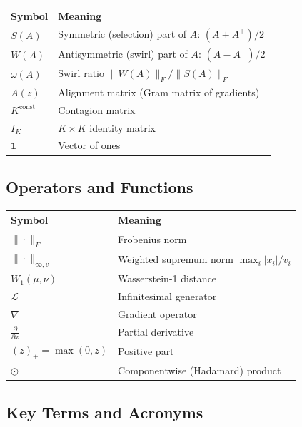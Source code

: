 \documentclass[12pt]{article}
\begin{document}
\begin{tabular}{ll}
\toprule
\textbf{Symbol} & \textbf{Meaning} \\
\midrule
$S(A)$ & Symmetric (selection) part of $A$: $(A + A^\top)/2$ \\
$W(A)$ & Antisymmetric (swirl) part of $A$: $(A - A^\top)/2$ \\
$\omega(A)$ & Swirl ratio $\|W(A)\|_F / \|S(A)\|_F$ \\
$A(z)$ & Alignment matrix (Gram matrix of gradients) \\
$K^{\text{const}}$ & Contagion matrix \\
$I_K$ & $K \times K$ identity matrix \\
$\mathbf{1}$ & Vector of ones \\
\bottomrule
\end{tabular}

\subsection{Operators and Functions}

\begin{tabular}{ll}
\toprule
\textbf{Symbol} & \textbf{Meaning} \\
\midrule
$\|\cdot\|_F$ & Frobenius norm \\
$\|\cdot\|_{\infty, v}$ & Weighted supremum norm $\max_i |x_i| / v_i$ \\
$W_1(\mu, \nu)$ & Wasserstein-1 distance \\
$\mathcal{L}$ & Infinitesimal generator \\
$\nabla$ & Gradient operator \\
$\frac{\partial}{\partial x}$ & Partial derivative \\
$(z)_+ = \max(0, z)$ & Positive part \\
$\odot$ & Componentwise (Hadamard) product \\
\bottomrule
\end{tabular}

\subsection{Key Terms and Acronyms}
\end{document}
